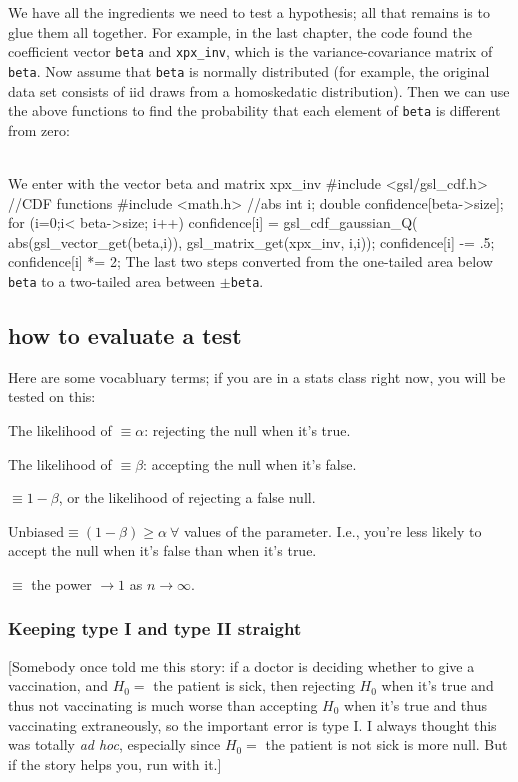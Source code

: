 We have all the ingredients we need to test a hypothesis; all that
remains is to glue them all together. For example, in the last chapter, the code
found the coefficient vector {\tt beta} and {\tt xpx\_inv}, which is the
variance-covariance matrix of {\tt beta}.  Now assume that {\tt beta}
is normally distributed (for example, the original data set consists
of iid draws from a homoskedatic distribution). Then we can use the
above functions to find the probability that each element of {\tt beta}
is different from zero:

\\We enter with the vector beta and matrix xpx_inv
#include <gsl/gsl_cdf.h>  //CDF functions
#include <math.h>         //abs
int i;
double confidence[beta->size];
for (i=0;i< beta->size; i++){
    confidence[i] = gsl_cdf_gaussian_Q( abs(gsl_vector_get(beta,i)), 
                         gsl_matrix_get(xpx_inv, i,i));
    confidence[i] -= .5;
    confidence[i] *= 2;
}
The last two steps converted from the one-tailed area below {\tt beta}
to a two-tailed area between $\pm${\tt beta}.



\subsection{how to evaluate a test}
Here are some vocabluary terms; if you are in a stats class right now,
you will be tested on this:

The likelihood of  $\equiv\alpha$: rejecting the null when it's true.

The likelihood of  $\equiv\beta$: accepting the null when
it's false.

$\equiv 1-\beta$, or the likelihood of rejecting a false null.

Unbiased$\equiv (1-\beta)\geq \alpha\ \forall$ values of the parameter.
I.e., you're less likely to accept the null when it's false than when
it's true.

$\equiv$ the power $\to 1$ as $n\to \infty$.

\subsubsection{Keeping type I and type II straight} 
[Somebody once told me this story: if a doctor is deciding
whether to give a vaccination, and $H_0=$ the patient is sick,
then rejecting $H_0$ when it's true and thus not vaccinating is much worse than accepting
$H_0$ when it's true and thus vaccinating extraneously, so the important error is type I. I always
thought this was totally {\it ad hoc}, especially since $H_0=$
the patient is not sick is more null. But if the story helps you, run
with it.]

